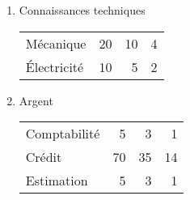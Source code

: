 \documentclass[11pt]{article}
\begin{document}
\begin{twocols}
\begin{enumerate}
\item Connaissances techniques
\label{sec:orgb82192d}

\begin{center}
\begin{tabular}{lrrr}
Mécanique & 20 & 10 & 4\\
Électricité & 10 & 5 & 2\\
\end{tabular}
\end{center}

\item Argent
\label{sec:orge19d6c4}

\begin{center}
\begin{tabular}{lrrr}
Comptabilité & 5 & 3 & 1\\
Crédit & 70 & 35 & 14\\
Estimation & 5 & 3 & 1\\
\end{tabular}
\end{center}
\end{enumerate}

\end{twocols}
\pagebreak
\end{document}
